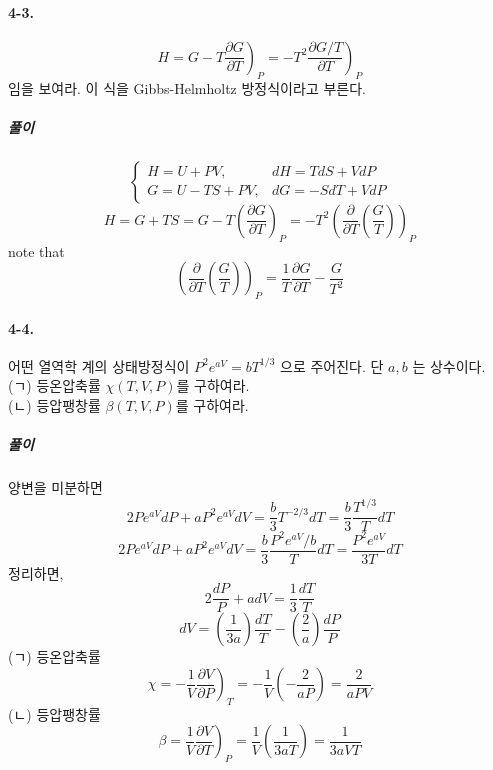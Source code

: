 \documentclass[a4paper,12pt]{report}
\begin{document}
	\paragraph{4-3. }$$H=G-T\left. \frac{\partial G}{\partial T}\right) _P=-T^2\left. \frac{\partial G/T}{\partial T}\right) _P$$ 임을 보여라. 이 식을 Gibbs-Helmholtz 방정식이라고 부른다. 
	\subparagraph{풀이}$$\begin{cases}
	H=U+PV,&dH=TdS+VdP\\G=U-TS+PV,&dG=-SdT+VdP
	\end{cases}$$
	$$H=G+TS=G-T\left(\frac{\partial G}{\partial T} \right)_P=-T^2\left(\frac{\partial}{\partial T}\left( \frac{G}{T}\right)\right)_P  $$
	note that 
	$$\left(\frac{\partial}{\partial T}\left( \frac{G}{T}\right)\right)_P=\frac{1}{T}\frac{\partial G}{\partial T}-\frac{G}{T^2}$$
	\paragraph{4-4. } 어떤 열역학 계의 상태방정식이 $P^2e^{aV}=bT^{1/3}$ 으로 주어진다. 단 $a,b$ 는 상수이다. \\
	(ㄱ) 등온압축률 $\chi(T,V,P)$를 구하여라.\\
	(ㄴ) 등압팽창률 $\beta(T,V,P)$를 구하여라.
	\subparagraph{풀이} 양변을 미분하면 
	$$2Pe^{aV}dP+aP^2e^{aV}dV=\frac{b}{3}T^{-2/3}dT=\frac{b}{3}\frac{T^{1/3}}{T}dT$$ 
	$$2Pe^{aV}dP+aP^2e^{aV}dV=\frac{b}{3}\frac{P^{2}e^{aV}/b}{T}dT=\frac{P^{2}e^{aV}}{3T}dT$$ 
	정리하면,
	$$2\frac{dP}{P}+adV=\frac{1}{3}\frac{dT}{T}$$
	$$dV=\left(\frac{1}{3a} \right)\frac{dT}{T}-\left( \frac{2}{a}\right) \frac{dP}{P} $$
	(ㄱ) 등온압축률
	$$\chi=-\frac{1}{V}\left. \frac{\partial V}{\partial P}\right)_T=-\frac{1}{V}\left( -\frac{2}{aP}\right) =\frac{2}{aPV} $$
	(ㄴ) 등압팽창률
	$$\beta=\frac{1}{V}\left. \frac{\partial V}{\partial T}\right)_P=\frac{1}{V}\left(\frac{1}{3aT} \right)=\frac{1}{3aVT}  $$
\end{document}

